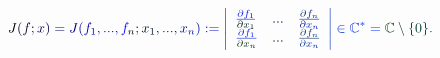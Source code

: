 \documentclass[12pt]{article}
\begin{document}
\makeatletter
\renewcommand*{\@textcolor}[3]{%
  \protect\leavevmode
  \begingroup
    \color#1{#2}#3%
  \endgroup
}
\makeatother
\begin{displaymath}
\mathcolor[RGB]{0,0,15}{J} \mathcolor[RGB]{0,0,30}{(} \mathcolor[RGB]{0,0,45}{f} \mathcolor[RGB]{0,0,60}{;} \mathcolor[RGB]{0,0,75}{x} \mathcolor[RGB]{0,0,90}{)} \mathcolor[RGB]{0,0,105}{=} \mathcolor[RGB]{0,0,120}{J} \mathcolor[RGB]{0,0,135}{(} \mathcolor[RGB]{0,0,150}{f} _ { \mathcolor[RGB]{0,0,165}{1} } \mathcolor[RGB]{0,0,180}{,} \mathcolor[RGB]{0,0,195}{.} \mathcolor[RGB]{0,0,210}{.} \mathcolor[RGB]{0,0,225}{.} \mathcolor[RGB]{0,0,240}{,} \mathcolor[RGB]{0,0,255}{f} _ { \mathcolor[RGB]{0,15,0}{n} } \mathcolor[RGB]{0,15,15}{;} \mathcolor[RGB]{0,15,30}{x} _ { \mathcolor[RGB]{0,15,45}{1} } \mathcolor[RGB]{0,15,60}{,} \mathcolor[RGB]{0,15,75}{.} \mathcolor[RGB]{0,15,90}{.} \mathcolor[RGB]{0,15,105}{.} \mathcolor[RGB]{0,15,120}{,} \mathcolor[RGB]{0,15,135}{x} _ { \mathcolor[RGB]{0,15,150}{n} } \mathcolor[RGB]{0,15,165}{)} \mathcolor[RGB]{0,15,180}{:} \mathcolor[RGB]{0,15,195}{=} \mathcolor[RGB]{0,15,210}{\left|} \begin{array} {lll} { \mathcolor[RGB]{0,15,225}{\frac { \mathcolor[RGB]{0,15,240}{\partial} \mathcolor[RGB]{0,15,255}{f} _ { \mathcolor[RGB]{0,30,0}{1} } } { \mathcolor[RGB]{0,30,15}{\partial} \mathcolor[RGB]{0,30,30}{x} _ { \mathcolor[RGB]{0,30,45}{1} } } } } & { \mathcolor[RGB]{0,30,60}{.} \mathcolor[RGB]{0,30,75}{.} \mathcolor[RGB]{0,30,90}{.} } & { \mathcolor[RGB]{0,30,105}{\frac { \mathcolor[RGB]{0,30,120}{\partial} \mathcolor[RGB]{0,30,135}{f} _ { \mathcolor[RGB]{0,30,150}{n} } } { \mathcolor[RGB]{0,30,165}{\partial} \mathcolor[RGB]{0,30,180}{x} _ { \mathcolor[RGB]{0,30,195}{n} } } } } \\ { \mathcolor[RGB]{0,30,210}{\frac { \mathcolor[RGB]{0,30,225}{\partial} \mathcolor[RGB]{0,30,240}{f} _ { \mathcolor[RGB]{0,30,255}{1} } } { \mathcolor[RGB]{0,45,0}{\partial} \mathcolor[RGB]{0,45,15}{x} _ { \mathcolor[RGB]{0,45,30}{n} } } } } & { \mathcolor[RGB]{0,45,45}{.} \mathcolor[RGB]{0,45,60}{.} \mathcolor[RGB]{0,45,75}{.} } & { \mathcolor[RGB]{0,45,90}{\frac { \mathcolor[RGB]{0,45,105}{\partial} \mathcolor[RGB]{0,45,120}{f} _ { \mathcolor[RGB]{0,45,135}{n} } } { \mathcolor[RGB]{0,45,150}{\partial} \mathcolor[RGB]{0,45,165}{x} _ { \mathcolor[RGB]{0,45,180}{n} } } } } \end{array} \mathcolor[RGB]{0,45,195}{\right|} \mathcolor[RGB]{0,45,210}{\in} \mathbb { \mathcolor[RGB]{0,45,225}{C} } ^ { \mathcolor[RGB]{0,45,240}{*} } \mathcolor[RGB]{0,45,255}{=} \mathbb { \mathcolor[RGB]{0,60,0}{C} } \mathcolor[RGB]{0,60,15}{\setminus} \mathcolor[RGB]{0,60,30}{\{} \mathcolor[RGB]{0,60,45}{0} \mathcolor[RGB]{0,60,60}{\}} \mathcolor[RGB]{0,60,75}{.}
\end{displaymath}
\end{document}
